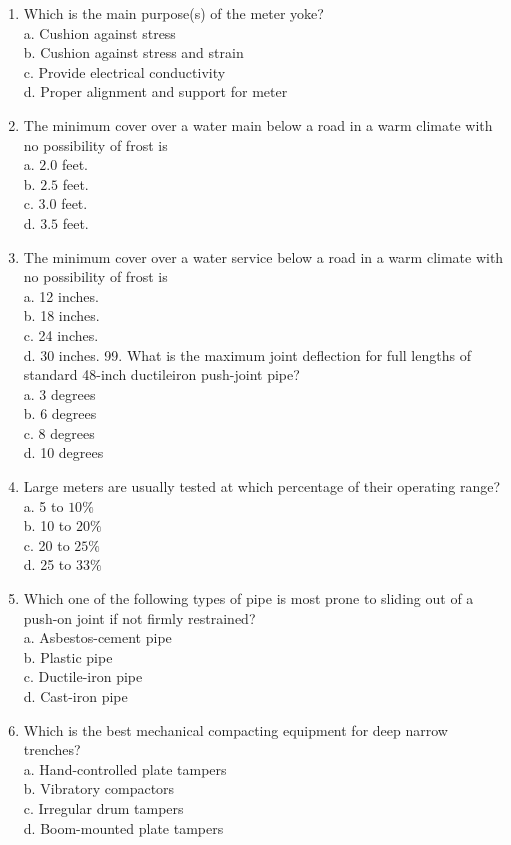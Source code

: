 \documentclass[10pt]{article}
\begin{document}
\begin{enumerate}
  \item Which is the main purpose(s) of the meter yoke?\\
a. Cushion against stress\\
b. Cushion against stress and strain\\
c. Provide electrical conductivity\\
d. Proper alignment and support for meter

  \item The minimum cover over a water main below a road in a warm climate with no possibility of frost is\\
a. $2.0$ feet.\\
b. $2.5$ feet.\\
c. $3.0$ feet.\\
d. $3.5$ feet.

  \item The minimum cover over a water service below a road in a warm climate with no possibility of frost is\\
a. 12 inches.\\
b. 18 inches.\\
c. 24 inches.\\
d. 30 inches. 99. What is the maximum joint deflection for full lengths of standard 48-inch ductileiron push-joint pipe?\\
a. 3 degrees\\
b. 6 degrees\\
c. 8 degrees\\
d. 10 degrees

  \item Large meters are usually tested at which percentage of their operating range?\\
a. 5 to $10 \%$\\
b. 10 to $20 \%$\\
c. 20 to $25 \%$\\
d. 25 to $33 \%$

  \item Which one of the following types of pipe is most prone to sliding out of a push-on joint if not firmly restrained?\\
a. Asbestos-cement pipe\\
b. Plastic pipe\\
c. Ductile-iron pipe\\
d. Cast-iron pipe

  \item Which is the best mechanical compacting equipment for deep narrow trenches?\\
a. Hand-controlled plate tampers\\
b. Vibratory compactors\\
c. Irregular drum tampers\\
d. Boom-mounted plate tampers


\end{enumerate}
\end{document}
